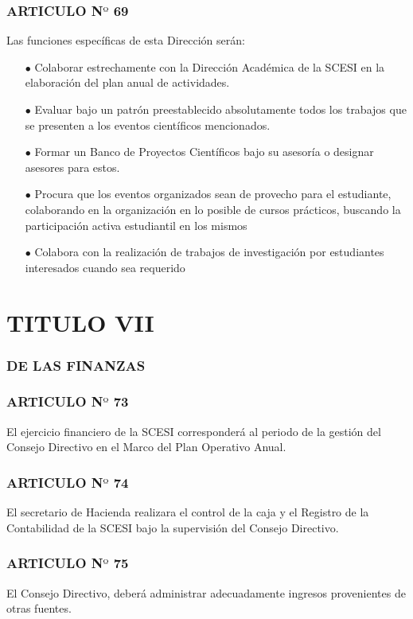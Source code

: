 \documentclass[11pt,letterpaper]{book}
\begin{document}
\begin{itemize}
\subsubsection*{ARTICULO N$º$ 69}
Las funciones específicas de esta Dirección serán:
\begin{itemize}
\item[$\bullet$] Colaborar estrechamente con la Dirección Académica de la SCESI en la elaboración del plan anual de actividades. 
\item[$\bullet$] Evaluar bajo un patrón preestablecido absolutamente todos los trabajos que se presenten a los eventos científicos mencionados. 
\item[$\bullet$] Formar un Banco de Proyectos Científicos bajo su asesoría o designar asesores para estos. 
\item[$\bullet$] Procura que los eventos organizados sean de provecho para el estudiante, colaborando en la organización en lo posible de cursos prácticos, buscando la participación activa estudiantil en los mismos 
\item[$\bullet$] Colabora con la realización de trabajos de investigación por estudiantes interesados cuando sea requerido 
\end{itemize}
\end{itemize}
\section*{TITULO VII}
\subsubsection*{DE LAS FINANZAS}
\subsubsection*{ARTICULO N$º$ 73}
El ejercicio financiero de la SCESI corresponderá al periodo de la gestión del Consejo Directivo en el Marco del Plan Operativo Anual. 
\subsubsection*{ARTICULO N$º$ 74}
El secretario de Hacienda realizara el control de la caja y el Registro de la Contabilidad de la SCESI bajo la supervisión del Consejo Directivo. 
\subsubsection*{ARTICULO N$º$ 75}
El Consejo Directivo, deberá administrar adecuadamente ingresos provenientes de otras fuentes.
\end{document}
